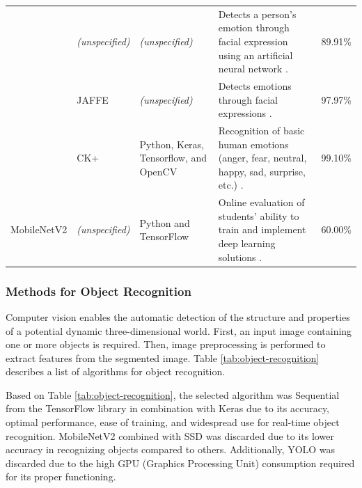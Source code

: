 \documentclass[a4paper,fleqn]{cas-sc}
\begin{document}
\begin{table}[H]
\begin{tabular}{p{}p{}p{}p{}p{}}
							& \textit{(unspecified)} & \textit{(unspecified)} & Detects a person's emotion through facial expression using an artificial neural network \citep{Kumar2021Emotion}. & \multicolumn{1}{r}{89.91\%} \\
							& JAFFE & \textit{(unspecified)} & Detects emotions through facial expressions \citep{Jaiswal2020Facial}. & \multicolumn{1}{r}{97.97\%} \\
							& CK+ & Python, Keras, Tensorflow, and OpenCV & Recognition of basic human emotions (anger, fear, neutral, happy, sad, surprise, etc.) \citep{Kedari2021Face}. & \multicolumn{1}{r}{99.10\%} \\
							MobileNetV2 & \textit{(unspecified)} & Python and TensorFlow & Online evaluation of students' ability to train and implement deep learning solutions \citep{Ilic2021Automatic}. & \multicolumn{1}{r}{60.00\%} \\ \hline
						\end{tabular}
					\end{table}
					
				\subsubsection*{Methods for Object Recognition}				
					Computer vision enables the automatic detection of the structure and properties of a potential dynamic three-dimensional world. First, an input image containing one or more objects is required. Then, image preprocessing is performed to extract features from the segmented image. Table \ref{tab:object-recognition} describes a list of algorithms for object recognition.
					
					Based on Table \ref{tab:object-recognition}, the selected algorithm was Sequential from the TensorFlow library in combination with Keras due to its accuracy, optimal performance, ease of training, and widespread use for real-time object recognition. MobileNetV2 combined with SSD was discarded due to its lower accuracy in recognizing objects compared to others. Additionally, YOLO was discarded due to the high GPU (Graphics Processing Unit) consumption required for its proper functioning.
					
\end{document}
